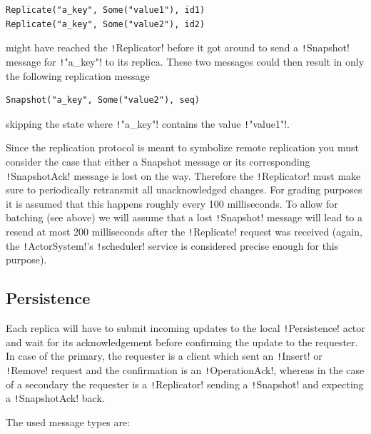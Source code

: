 \documentclass{article}
\begin{document}
\begin{verbatim}
Replicate("a_key", Some("value1"), id1) 
Replicate("a_key", Some("value2"), id2) 
\end{verbatim}
might have reached the \texttt!Replicator! before it got around to send a \texttt!Snapshot! message for \texttt!"a_key"! to its replica. These two messages could then result in only the following replication message

\begin{verbatim}
Snapshot("a_key", Some("value2"), seq) 
\end{verbatim}

skipping the state where \texttt!"a_key"! contains the value \texttt!"value1"!.

Since the replication protocol is meant to symbolize remote replication you must consider the case that either a Snapshot message or its corresponding \texttt!SnapshotAck! message is lost on the way. Therefore the \texttt!Replicator!  must make sure to periodically retransmit all unacknowledged changes.  For grading purposes it is assumed that this happens roughly every 100  milliseconds. To allow for batching (see above) we will assume that a  lost \texttt!Snapshot! message will lead to a resend at most 200 milliseconds after the \texttt!Replicate! request was received (again, the \texttt!ActorSystem!’s \texttt!scheduler! service is considered precise enough for this purpose).

\subsection{Persistence}\label{ss:persistence}

Each replica will have to submit incoming updates to the local \texttt!Persistence! actor and wait for its acknowledgement before confirming the update to the requester. In case of the primary, the requester is a client which sent an \texttt!Insert! or \texttt!Remove! request and the confirmation is an \texttt!OperationAck!, whereas in the case of a secondary the requester is a \texttt!Replicator! sending a \texttt!Snapshot! and expecting a \texttt!SnapshotAck! back.

The used message types are:
\end{document}
